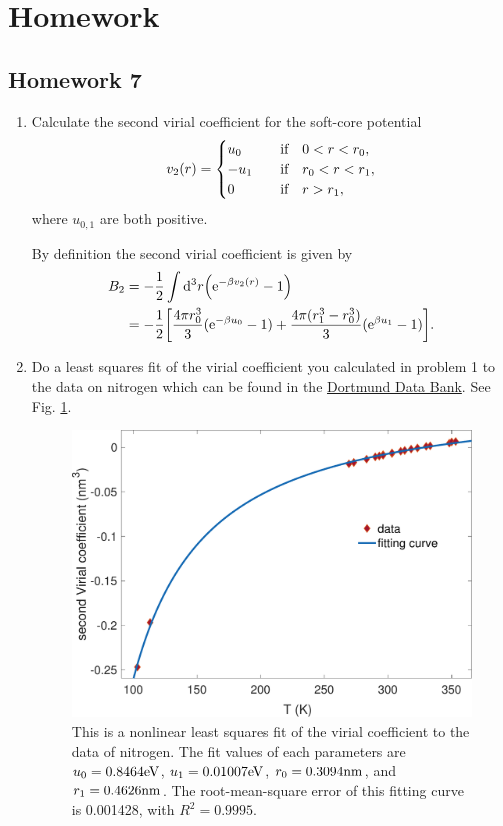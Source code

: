 \documentclass[10pt]{article}
\begin{document}
	\newpage

	\section{Homework}\label{sec: homework}

	\subsection{Homework 7}
	\begin{enumerate}
		\item Calculate the second virial coefficient for the soft-core potential
		\begin{equation}
			v_2(r) =
			\begin{cases}
				u_0 & \qif 0 < r < r_0, \\
				-u_1 & \qif r_0 < r < r_1, \\
				0 & \qif r > r_1,
			\end{cases}
		\end{equation}
		where $u_{0,1}$ are both positive.

		By definition the second virial coefficient is given by
		\begin{align}
			B_2 &= -\frac{1}{2} \int \dd^3 r \qty({\mathrm{e}}^{-\beta v_2(r)} - 1) \\
			&= -\frac{1}{2} \qty[\frac{4\pi r_0^3}{3}({\mathrm{e}}^{-\beta u_0} - 1) + \frac{4\pi (r_1^3 - r_0^3)}{3}({\mathrm{e}}^{\beta u_1} - 1)].
		\end{align}
		\item Do a least squares fit of the virial coefficient you calculated in problem 1 to the data on nitrogen which can be found in the \href{http://www.ddbst.com/en/EED/PCP/BII_C1056.php}{Dortmund Data Bank}. See Fig. \ref{fig: virial fit}.
		\begin{figure}[htbp]
			\centering
			\includegraphics[width=0.7 \textwidth]{figure/virial_fit.pdf}
			\caption{This is a nonlinear least squares fit of the virial coefficient to the data of nitrogen. The fit values of each parameters are $u_0 = 0.8464 {\mathrm{eV}}$, $u_1 = 0.01007 {\mathrm{eV}}$, $r_0 = 0.3094 {\mathrm{nm}}$, and $r_1 = 0.4626 {\mathrm{nm}}$. The root-mean-square error of this fitting curve is 0.001428, with $R^2 = 0.9995$.}
			\label{fig: virial fit}
		\end{figure}
	\end{enumerate}



	\newpage
\end{document}
